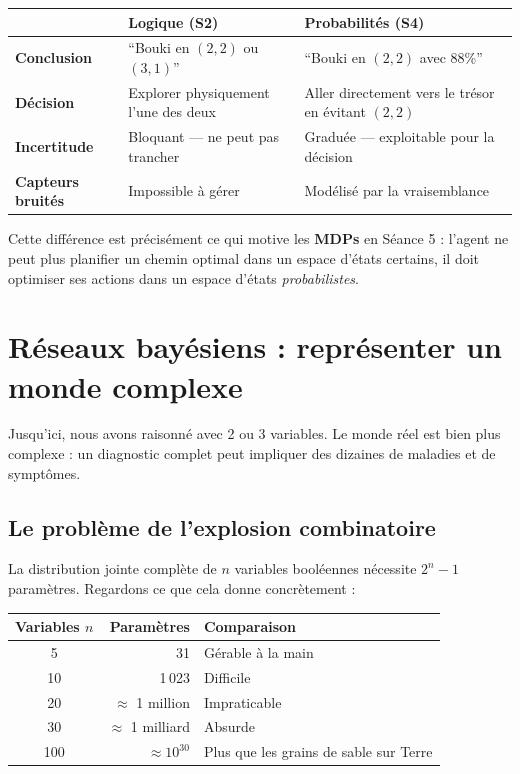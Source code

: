 \documentclass[11pt,a4paper]{article}
\begin{document}
\begin{retenirbox}
\begin{center}
\begin{tabular}{lp{5cm}p{5cm}}
\toprule
& \textbf{Logique (S2)} & \textbf{Probabilités (S4)} \\
\midrule
\textbf{Conclusion} & ``Bouki en $(2,2)$ ou $(3,1)$'' & ``Bouki en $(2,2)$ avec 88\%'' \\
\textbf{Décision} & Explorer physiquement l'une des deux & Aller directement vers le trésor en évitant $(2,2)$ \\
\textbf{Incertitude} & Bloquant — ne peut pas trancher & Graduée — exploitable pour la décision \\
\textbf{Capteurs bruités} & Impossible à gérer & Modélisé par la vraisemblance \\
\bottomrule
\end{tabular}
\end{center}

Cette différence est précisément ce qui motive les \textbf{MDPs} en Séance 5 : l'agent ne peut plus planifier un chemin optimal dans un espace d'états certains, il doit optimiser ses actions dans un espace d'états \textit{probabilistes}.
\end{retenirbox}

\section{Réseaux bayésiens : représenter un monde complexe}

Jusqu'ici, nous avons raisonné avec 2 ou 3 variables. Le monde réel est bien plus complexe : un diagnostic complet peut impliquer des dizaines de maladies et de symptômes.

\subsection{Le problème de l'explosion combinatoire}

La distribution jointe complète de $n$ variables booléennes nécessite $2^n - 1$ paramètres. Regardons ce que cela donne concrètement :

\begin{center}
\begin{tabular}{crl}
\toprule
\textbf{Variables} $n$ & \textbf{Paramètres} & \textbf{Comparaison} \\
\midrule
5 & 31 & Gérable à la main \\
10 & 1\,023 & Difficile \\
20 & $\approx$ 1 million & Impraticable \\
30 & $\approx$ 1 milliard & Absurde \\
100 & $\approx 10^{30}$ & Plus que les grains de sable sur Terre \\
\bottomrule
\end{tabular}
\end{center}
\end{document}
